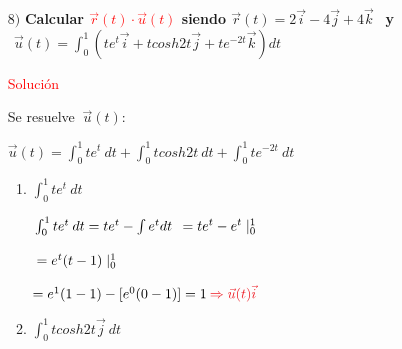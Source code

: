 \documentclass[12pt, letter-paper]{article}
\begin{document}
\begin{enumerate}
    \item [$8)$]
    \normalsize{\textbf{Calcular \textcolor{Red}{$\Vec{r}(t) \cdot \Vec{u}(t)$} siendo $\vec{r}(t)= 2\vec{i}-4\vec{j}+4\vec{k}\:\:$ y $\:\:\vec{u}(t)= \int_{0}^{1}\left ( te^{t}\vec{i}+tcosh2t\vec{j}+te^{-2t}\vec{k} \right )dt$}} \par
    \vspace{0.5cm}
    \large{\textcolor{red}{Solución}\par}
    \vspace{0.5cm}
    \normalsize{} 
    \vspace{0.5cm}
    \normalsize{Se resuelve \large{$\:\vec{u}(t)$}:}\par
    \vspace{0.5cm}
    $\vec{u}(t)= \int_{0}^{1} te^{t}\:dt+ \int_{0}^{1} tcosh2t\:dt+ \int_{0}^{1} te^{-2t}\:dt$
    \vspace{0.5cm}
    \begin{enumerate}
        \item{\textcolor{Sepia}{$\int_{0}^{1} te^{t}\:dt$}} \par
        \normalsize{\par}
        $\\\int_{0}^{1} te^{t}\:dt=te^{t}-\int{e^{t}}dt$
        \vspace{0.7cm}
        $\\=te^{t}-e^{t}\mid_{0}^{1}\:$\par
        $\\=e^{t}(t-1)\mid_{0}^{1}\:\\$\par
        $=e^{1}(1-1)-[e^{0}(0-1)]=1 \:\textcolor{Red}{\Rightarrow  \vec{u}(t)\vec{i}}$
        \vspace{0.5cm}
        \item {\textcolor{WildStrawberry}{$\int_{0}^{1} tcosh2t\vec{j}\:dt$}}\par
        \normalsize{}
\end{enumerate}
\end{enumerate}
\end{document}

